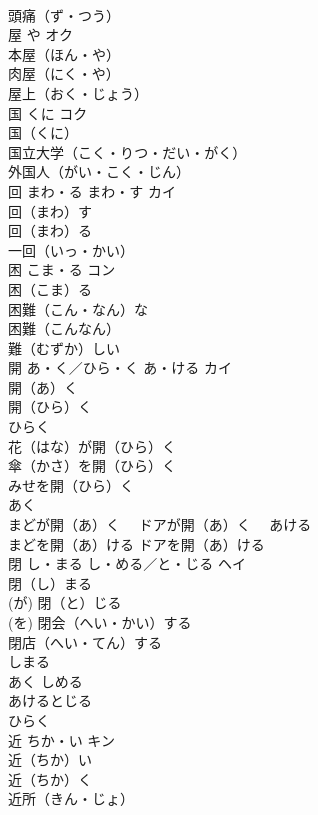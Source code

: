 \documentclass[8pt]{extreport}
\begin{document}
\begin{CJK}{UTF8}{min}
\\	頭痛（ず・つう）　
\\	屋	や	オク	
\\	本屋（ほん・や）　
\\	肉屋（にく・や）　
\\	屋上（おく・じょう）　
\\	国	くに	コク	
\\	国（くに）　
\\	国立大学（こく・りつ・だい・がく）　
\\	外国人（がい・こく・じん）　
\\	回	まわ・る まわ・す	カイ	
\\	回（まわ）す　
\\	回（まわ）る　
\\	一回（いっ・かい）　
\\	困	こま・る	コン	
\\	困（こま）る　
\\	困難（こん・なん）な　
\\	困難（こんなん）
\\	難（むずか）しい　
\\	開	あ・く／ひら・く あ・ける	カイ	
\\	開（あ）く　
\\	開（ひら）く　
\\	ひらく　
\\	花（はな）が開（ひら）く　
\\	傘（かさ）を開（ひら）く　
\\	みせを開（ひら）く　
\\	あく　
\\	まどが開（あ）く　 ドアが開（あ）く　 あける　
\\	まどを開（あ）ける ドアを開（あ）ける	
\\	閉	し・まる し・める／と・じる	ヘイ	
\\	閉（し）まる　
\\	(が) 閉（と）じる　
\\	(を) 閉会（へい・かい）する　
\\	閉店（へい・てん）する　
\\	しまる　
\\	あく しめる　
\\	あけるとじる　
\\	ひらく	
\\	近	ちか・い	キン	
\\	近（ちか）い　
\\	近（ちか）く　
\\	近所（きん・じょ）　

\end{CJK}
\end{document}
